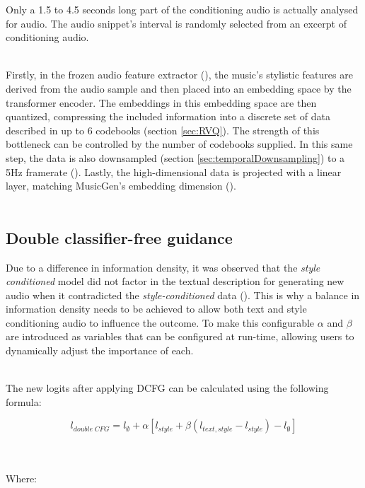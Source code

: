 \documentclass[a4paper,12pt,twoside]{article}
\begin{document}
Only a 1.5 to 4.5 seconds long part of the conditioning audio is actually analysed for audio. The audio snippet's interval is randomly selected from an excerpt of conditioning audio.\\ \

Firstly, in the frozen audio feature extractor (\cite{defossezHighFidelityNeural2022,liMERTAcousticMusic2023,wonFoundationModelMusic2024}), the music's stylistic features are derived from the audio sample and then placed into an embedding space by the transformer encoder.
The embeddings in this embedding space are then quantized, compressing the included information into a discrete set of data described in up to 6 codebooks (section \ref{sec:RVQ}). The strength of this bottleneck can be controlled by the number of codebooks supplied. In this same step, the data is also downsampled (section \ref{sec:temporalDownsampling}) to a 5Hz framerate (\cite{rouardAudioConditioningMusic2024}).
Lastly, the high-dimensional data is projected with a linear layer, matching MusicGen's embedding dimension (\cite{rouardAudioConditioningMusic2024}).\\ \

\subsection{Double classifier-free guidance}

Due to a difference in information density, it was observed that the \textit{style conditioned} model did not factor in the textual description for generating new audio when it contradicted the \textit{style-conditioned} data (\cite{rouardAudioConditioningMusic2024}). This is why a balance in information density needs to be achieved to allow both text and style conditioning audio to influence the outcome. To make this configurable $\alpha$ and $\beta$ are introduced as variables that can be configured at run-time, allowing users to dynamically adjust the importance of each.\\ \

The new logits after applying DCFG can be calculated using the following formula:

\begin{equation}
    l_{double \; CFG} = l_\emptyset + \alpha[l_{style}+\beta(l_{text,style}-l_{style})-l_{\emptyset}]
    \label{eq:doublecfg}
\end{equation} \\ \

Where:
\end{document}
